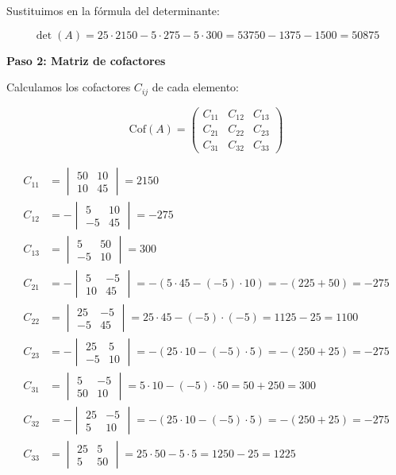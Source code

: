 \documentclass[10pt,a4paper]{article}
\begin{document}
{\begin{enumerate}
Sustituimos en la fórmula del determinante:

\[
\det(A) = 25 \cdot 2150 - 5 \cdot 275 - 5 \cdot 300 = 53750 - 1375 - 1500 = \boxed{50875}
\]

{\bf Paso 2: Matriz de cofactores}

Calculamos los cofactores \( C_{ij} \) de cada elemento:

\[
\text{Cof}(A) = \begin{pmatrix}
C_{11} & C_{12} & C_{13} \\
C_{21} & C_{22} & C_{23} \\
C_{31} & C_{32} & C_{33}
\end{pmatrix}
\]

\begin{align*}
C_{11} &= \begin{vmatrix} 50 & 10 \\ 10 & 45 \end{vmatrix} = 2150 \\
C_{12} &= -\begin{vmatrix} 5 & 10 \\ -5 & 45 \end{vmatrix} = -275 \\
C_{13} &= \begin{vmatrix} 5 & 50 \\ -5 & 10 \end{vmatrix} = 300 \\
C_{21} &= -\begin{vmatrix} 5 & -5 \\ 10 & 45 \end{vmatrix} = -(5 \cdot 45 - (-5) \cdot 10) = -(225 + 50) = -275 \\
C_{22} &= \begin{vmatrix} 25 & -5 \\ -5 & 45 \end{vmatrix} = 25 \cdot 45 - (-5) \cdot (-5) = 1125 - 25 = 1100 \\
C_{23} &= -\begin{vmatrix} 25 & 5 \\ -5 & 10 \end{vmatrix} = -(25 \cdot 10 - (-5) \cdot 5) = -(250 + 25) = -275 \\
C_{31} &= \begin{vmatrix} 5 & -5 \\ 50 & 10 \end{vmatrix} = 5 \cdot 10 - (-5) \cdot 50 = 50 + 250 = 300 \\
C_{32} &= -\begin{vmatrix} 25 & -5 \\ 5 & 10 \end{vmatrix} = -(25 \cdot 10 - (-5) \cdot 5) = -(250 + 25) = -275 \\
C_{33} &= \begin{vmatrix} 25 & 5 \\ 5 & 50 \end{vmatrix} = 25 \cdot 50 - 5 \cdot 5 = 1250 - 25 = 1225
\end{align*}


\end{enumerate}}
\end{document}
